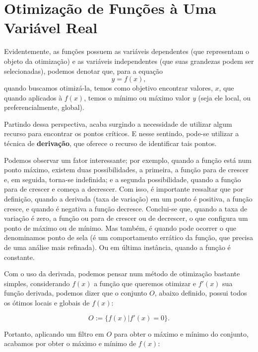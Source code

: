 \section{{Otimização de Funções à Uma Variável Real}}\label{otim_uma_var}

\hspace{0.8cm}
Evidentemente, as funções possuem as variáveis dependentes (que representam o
objeto da otimização) e as variáveis independentes (que suas grandezas podem
ser selecionadas), podemos denotar que, para a equação
\begin{equation}
    y = f(x),
\end{equation}
quando buscamos otimizá-la, temos como objetivo encontrar valores, \(x\), que
quando aplicados à \(f(x)\), temos o mínimo ou máximo valor \textit{y} (seja
ele local, ou preferencialmente, global).

Partindo dessa perspectiva, acaba surgindo a necessidade de utilizar algum
recurso para encontrar os pontos críticos. E nesse sentindo, pode-se utilizar
a técnica de \textbf{derivação}, que oferece o recurso de identificar tais
pontos.


Podemos observar um fator interessante; por exemplo,
quando a função está num ponto máximo, existem duas possibilidades, a primeira,
a função para de crescer e, em seguida, torna-se indefinida; e a
segunda possibilidade, quando a função para de crescer e começa a decrescer.
Com isso, é importante ressaltar que por definição, quando a derivada (taxa de
variação) em um ponto é positiva, a função cresce, e quando é negativa a função
decresce. Conclui-se que, quando a taxa de variação é zero, a função ou para de
crescer ou de decrescer, o que configura um ponto de máximo ou de mínimo. Mas
também, é quando pode ocorrer o que denominamos ponto de sela (é um
comportamento errático da função, que precisa de uma análise mais refinada). Ou
em última instância, quando a função é constante.

Com o uso da derivada, podemos pensar num método de otimização bastante simples,
considerando \(f(x)\) a função que queremos otimizar e \(f'(x)\) sua função
derivada, podemos dizer que o conjunto $O$, abaixo definido, possui todos os
ótimos locais e globais de \(f(x)\):

\begin{equation}
    O := \{f(x) | f'(x) = 0\}.
    \label{equacao_conjunto_o}
\end{equation}


Portanto, aplicando um filtro em $O$ para obter o máximo e mínimo do conjunto,
acabamos por obter o máximo e mínimo de \(f(x)\):


